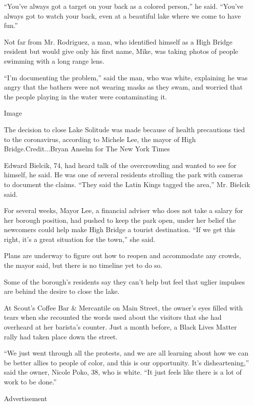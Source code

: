 ``You've always got a target on your back as a colored person,'' he
said. ``You've always got to watch your back, even at a beautiful lake
where we come to have fun.''

Not far from Mr. Rodriguez, a man, who identified himself as a High
Bridge resident but would give only his first name, Mike, was taking
photos of people swimming with a long range lens.

``I'm documenting the problem,'' said the man, who was white, explaining
he was angry that the bathers were not wearing masks as they swam, and
worried that the people playing in the water were contaminating it.

Image

The decision to close Lake Solitude was made because of health
precautions tied to the coronavirus, according to Michele Lee, the mayor
of High Bridge.Credit...Bryan Anselm for The New York Times

Edward Bielcik, 74, had heard talk of the overcrowding and wanted to see
for himself, he said. He was one of several residents strolling the park
with cameras to document the claims. ``They said the Latin Kings tagged
the area,'' Mr. Bielcik said.

For several weeks, Mayor Lee, a financial adviser who does not take a
salary for her borough position, had pushed to keep the park open, under
her belief the newcomers could help make High Bridge a tourist
destination. ``If we get this right, it's a great situation for the
town,'' she said.

Plans are underway to figure out how to reopen and accommodate any
crowds, the mayor said, but there is no timeline yet to do so.

Some of the borough's residents say they can't help but feel that uglier
impulses are behind the desire to close the lake.

At Scout's Coffee Bar \& Mercantile on Main Street, the owner's eyes
filled with tears when she recounted the words used about the visitors
that she had overheard at her barista's counter. Just a month before, a
Black Lives Matter rally had taken place down the street.

``We just went through all the protests, and we are all learning about
how we can be better allies to people of color, and this is our
opportunity. It's disheartening,'' said the owner, Nicole Poko, 38, who
is white. ``It just feels like there is a lot of work to be done.''

Advertisement

